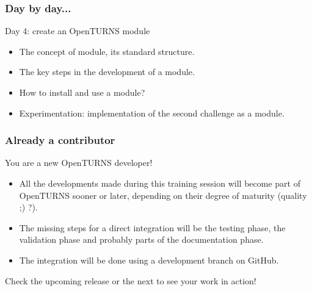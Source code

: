 \documentclass{beamer}
\begin{document}
\begin{frame}
  \frametitle{Day by day...}
  \begin{block}{Day 4: create an OpenTURNS module}
    \begin{itemize}
    \item The concept of module, its standard structure.
    \item The key steps in the development of a module.
    \item How to install and use a module?
    \item Experimentation: implementation of the second challenge as a module.
    \end{itemize}
  \end{block}
\end{frame}
\begin{frame}
  \frametitle{Already a contributor}
  \begin{block}{You are a new OpenTURNS developer!}
    \begin{itemize}
    \item All the developments made during this training session will become part of OpenTURNS sooner or later, depending on their degree of maturity (quality ;) ?).
    \item The missing steps for a direct integration will be the testing phase, the validation phase and probably parts of the documentation phase.
    \item The integration will be done using a development branch on GitHub.
    \end{itemize}
    Check the upcoming release or the next to see your work in action!
  \end{block}
\end{frame}
\end{document}
